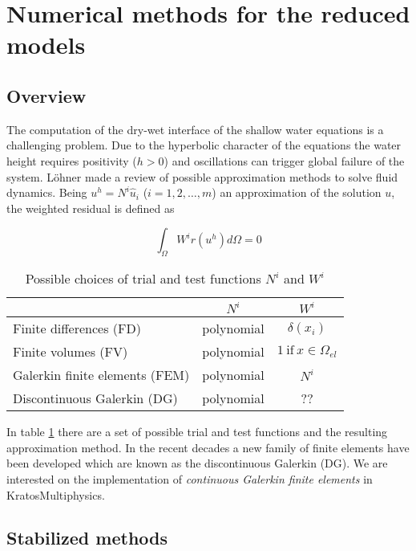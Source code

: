 \section{Numerical methods for the reduced models}


\subsection{Overview}

The computation of the dry-wet interface of the shallow water equations is a challenging problem. Due to the hyperbolic character of the equations the water height requires positivity ($h>0$) and oscillations can trigger global failure of the system. Löhner \cite{lohner2008} made a review of possible approximation methods to solve fluid dynamics. Being $u^h = N^i\hat{u}_i$ ($i=1,2,\dots,m$) an approximation of the solution $u$, the weighted residual is defined as

\begin{equation}
\int_{\Omega} W^ir(u^h)d\Omega = 0
\end{equation}

\begin{table}
\centering
\begin{tabular}{|l|c|c|}
\hline
 & $N^i$ & $W^i$ \\ \hline
Finite differences (FD)         & polynomial & $\delta(x_i)$ \\ \hline
Finite volumes (FV)             & polynomial & $1 \ \text{if} \ x\in\Omega_{el}$ \\ \hline
Galerkin finite elements (FEM)  & polynomial & $N^i$ \\ \hline
Discontinuous Galerkin (DG)     & polynomial & ?? \\ \hline
\end{tabular}
\caption{Possible choices of trial and test functions $N^i$ and $W^i$}
\label{possible_trial_functions}
\end{table}

In table \ref{possible_trial_functions} there are a set of possible trial and test functions and the resulting approximation method. In the recent decades a new family of finite elements have been developed which are known as the discontinuous Galerkin (DG). We are interested on the implementation of \emph{continuous Galerkin finite elements} in KratosMultiphysics.


\subsection{Stabilized methods}



